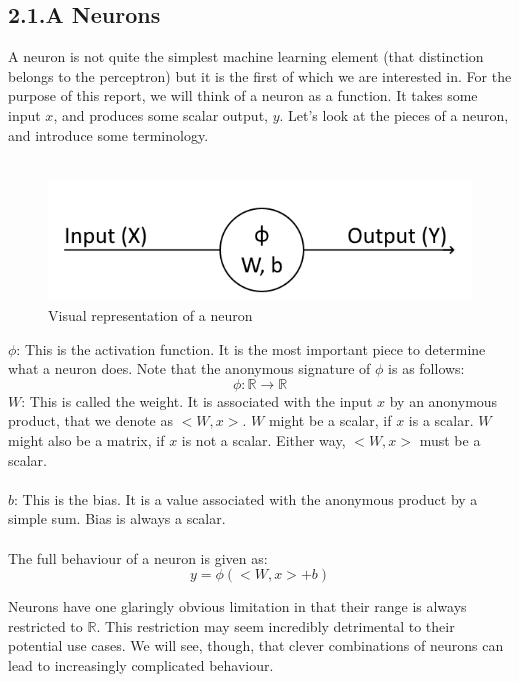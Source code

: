 \documentclass{article}
\begin{document}
\subsection*{2.1.A Neurons}
A neuron is not quite the simplest machine learning element (that distinction belongs to the perceptron) but it is the first of which we are interested in. For the purpose of this report, we will think of a neuron as a function. It takes some input $x$, and produces some scalar output, $y$. Let’s look at the pieces of a neuron, and introduce some terminology.\\\\
\begin{figure}[H]
\includegraphics[width=\textwidth]{diagrams/neuron}
\caption{Visual representation of a neuron}
\end{figure}
$\phi$: This is the activation function. It is the most important piece to determine what a neuron does. Note that the anonymous signature of $\phi$ is as follows:
\[\phi: \mathbb{R} \rightarrow \mathbb{R}\]
$W$: This is called the weight. It is associated with the input $x$ by an anonymous product, that we denote as $<W, x>$. $W$ might be a scalar, if $x$ is a scalar. $W$ might also be a matrix, if $x$ is not a scalar. Either way, $<W,x>$ must be a scalar.\\\\
$b$: This is the bias. It is a value associated with the anonymous product by a simple sum. Bias is always a scalar.\\\\
The full behaviour of a neuron is given as:
\[y = \phi( <W,x> + b )\]

Neurons have one glaringly obvious limitation in that their range is always restricted to $\mathbb{R}$. This restriction may seem incredibly detrimental to their potential use cases. We will see, though, that clever combinations of neurons can lead to increasingly complicated behaviour.
\\
\end{document}
